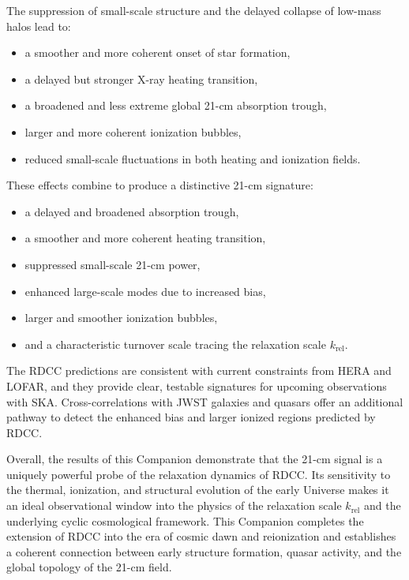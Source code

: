 \documentclass[11pt,a4paper]{article}
\begin{document}
The suppression of small-scale structure and the delayed collapse of low-mass halos lead to:
\begin{itemize}
\item a smoother and more coherent onset of star formation,
\item a delayed but stronger X-ray heating transition,
\item a broadened and less extreme global 21-cm absorption trough,
\item larger and more coherent ionization bubbles,
\item reduced small-scale fluctuations in both heating and ionization fields.
\end{itemize}

These effects combine to produce a distinctive 21-cm signature:
\begin{itemize}
\item a delayed and broadened absorption trough,
\item a smoother and more coherent heating transition,
\item suppressed small-scale 21-cm power,
\item enhanced large-scale modes due to increased bias,
\item larger and smoother ionization bubbles,
\item and a characteristic turnover scale tracing the relaxation scale $k_{\mathrm{rel}}$.
\end{itemize}

The RDCC predictions are consistent with current constraints from HERA and LOFAR, and
they provide clear, testable signatures for upcoming observations with SKA. Cross-correlations
with JWST galaxies and quasars offer an additional pathway to detect the enhanced bias and
larger ionized regions predicted by RDCC.

Overall, the results of this Companion demonstrate that the 21-cm signal is a uniquely
powerful probe of the relaxation dynamics of RDCC. Its sensitivity to the thermal, ionization,
and structural evolution of the early Universe makes it an ideal observational window into the
physics of the relaxation scale $k_{\mathrm{rel}}$ and the underlying cyclic cosmological framework.
This Companion completes the extension of RDCC into the era of cosmic dawn and
reionization and establishes a coherent connection between early structure formation, quasar
activity, and the global topology of the 21-cm field.

\appendix
\end{document}

